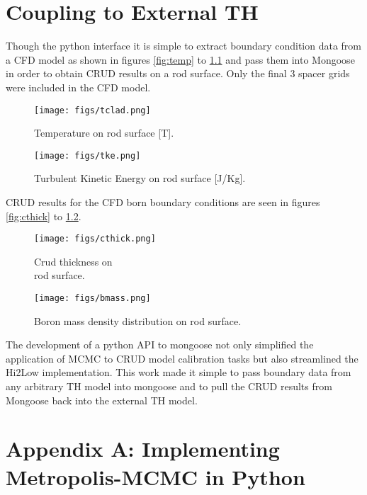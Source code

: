 \documentclass[10pt,a4paper]{report}
\begin{document}
\chapter{Coupling to External TH}

Though the python interface it is simple to extract boundary condition data from a CFD model as shown in figures \ref{fig:temp} to \ref{fig:tke} and pass them into Mongoose in order to obtain CRUD results on a rod surface.  Only the final 3 spacer grids were included in the CFD model.

\begin{figure}
    \centering
    \begin{minipage}{.5\textwidth}
        \centering
        \texttt{[image: figs/tclad.png]}
        \caption{Temperature on rod surface [T]. \label{fig:temp}}
    \end{minipage}%
    \begin{minipage}{.5\textwidth}
        \centering
        \texttt{[image: figs/tke.png]}
        \caption{Turbulent Kinetic Energy on rod surface [J/Kg]. \label{fig:tke}}
    \end{minipage}
\end{figure}
CRUD results for the CFD born boundary conditions are seen in figures \ref{fig:cthick} to \ref{fig:bmass}.
\begin{figure}
    \centering
    \begin{minipage}{.5\textwidth}
        \centering
        \texttt{[image: figs/cthick.png]}
        \caption{Crud thickness on \\
        rod surface. \label{fig:cthick}}
    \end{minipage}%
    \begin{minipage}{.5\textwidth}
        \centering
        \texttt{[image: figs/bmass.png]}
        \caption{Boron mass density distribution on rod surface. \label{fig:bmass}}
    \end{minipage}
\end{figure}

The development of a python API to mongoose not only simplified the application of MCMC to CRUD model calibration tasks but also streamlined the Hi2Low implementation.  This work made it simple to pass boundary data from any arbitrary TH model into mongoose and to pull the CRUD results from Mongoose back into the external TH model.

\chapter{Appendix A: Implementing Metropolis-MCMC in Python}
\end{document}

